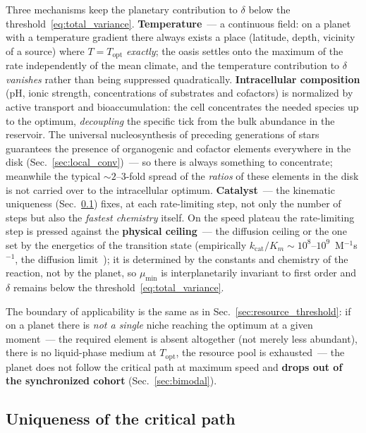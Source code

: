 \documentclass[11pt,a4paper]{article}
\begin{document}
Three mechanisms keep the planetary contribution to $\delta$ below the threshold~\eqref{eq:total_variance}. \textbf{Temperature}~--- a continuous field: on a planet with a temperature gradient there always exists a place (latitude, depth, vicinity of a source) where $T = T_{\mathrm{opt}}$ \emph{exactly}; the oasis settles onto the maximum of the rate independently of the mean climate, and the temperature contribution to $\delta$ \emph{vanishes} rather than being suppressed quadratically. \textbf{Intracellular composition} (pH, ionic strength, concentrations of substrates and cofactors) is normalized by active transport and bioaccumulation: the cell concentrates the needed species up to the optimum, \emph{decoupling} the specific tick from the bulk abundance in the reservoir. The universal nucleosynthesis of preceding generations of stars guarantees the presence of organogenic and cofactor elements everywhere in the disk (Sec.~\ref{sec:local_conv})~--- so there is always something to concentrate; meanwhile the typical $\sim 2$--$3$-fold spread of the \emph{ratios} of these elements in the disk is not carried over to the intracellular optimum. \textbf{Catalyst}~--- the kinematic uniqueness (Sec.~\ref{sec:uniqueness}) fixes, at each rate-limiting step, not only the number of steps but also the \emph{fastest chemistry} itself. On the speed plateau the rate-limiting step is pressed against the \textbf{physical ceiling}~--- the diffusion ceiling or the one set by the energetics of the transition state (empirically $k_{\mathrm{cat}}/K_m\sim10^{8}$--$10^{9}$~M$^{-1}$s$^{-1}$, the diffusion limit~\cite{Bar-Even2011}); it is determined by the constants and chemistry of the reaction, not by the planet, so $\mu_{\min}$ is interplanetarily invariant to first order and $\delta$ remains below the threshold~\eqref{eq:total_variance}.

The boundary of applicability is the same as in Sec.~\ref{sec:resource_threshold}: if on a planet there is \emph{not a single} niche reaching the optimum at a given moment~--- the required element is absent altogether (not merely less abundant), there is no liquid-phase medium at $T_{\mathrm{opt}}$, the resource pool is exhausted~--- the planet does not follow the critical path at maximum speed and \textbf{drops out of the synchronized cohort} (Sec.~\ref{sec:bimodal}).

\subsection{Uniqueness of the critical path}
\label{sec:uniqueness}
\end{document}
